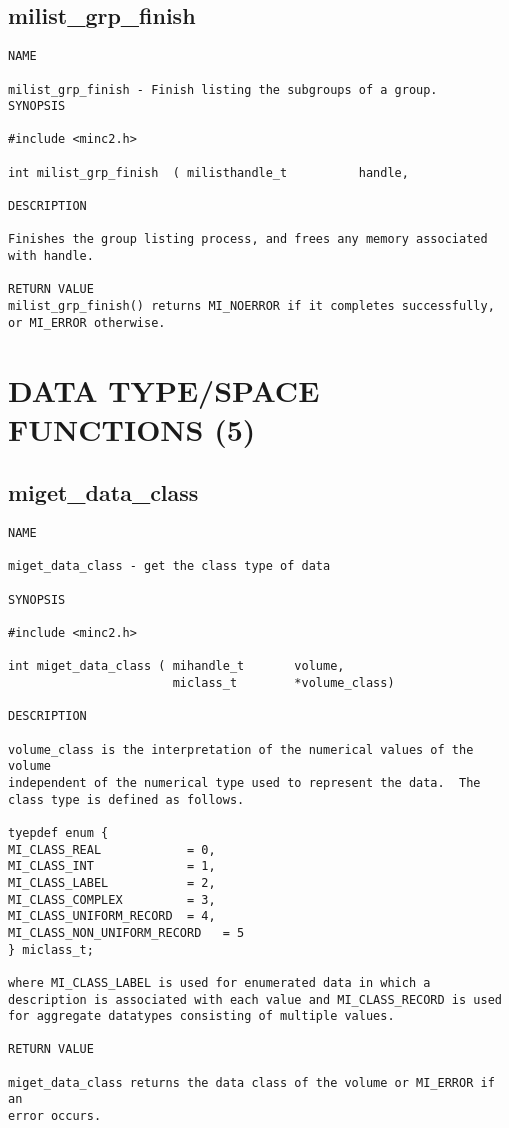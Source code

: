 \documentclass{article}
\begin{document}
\subsection{milist\_grp\_finish}

\begin{verbatim}
NAME

milist_grp_finish - Finish listing the subgroups of a group.
SYNOPSIS

#include <minc2.h>

int milist_grp_finish  ( milisthandle_t          handle, 
                       
DESCRIPTION

Finishes the group listing process, and frees any memory associated
with handle.

RETURN VALUE
milist_grp_finish() returns MI_NOERROR if it completes successfully,
or MI_ERROR otherwise.

\end{verbatim}

\section{DATA TYPE/SPACE FUNCTIONS (5)}
\subsection{miget\_data\_class}

\begin{verbatim}
NAME

miget_data_class - get the class type of data

SYNOPSIS

#include <minc2.h>

int miget_data_class ( mihandle_t       volume,
                       miclass_t        *volume_class) 

DESCRIPTION

volume_class is the interpretation of the numerical values of the volume
independent of the numerical type used to represent the data.  The
class type is defined as follows.

tyepdef enum {
MI_CLASS_REAL            = 0,
MI_CLASS_INT             = 1,
MI_CLASS_LABEL           = 2,
MI_CLASS_COMPLEX         = 3,
MI_CLASS_UNIFORM_RECORD  = 4,
MI_CLASS_NON_UNIFORM_RECORD   = 5
} miclass_t;

where MI_CLASS_LABEL is used for enumerated data in which a
description is associated with each value and MI_CLASS_RECORD is used
for aggregate datatypes consisting of multiple values.
 
RETURN VALUE

miget_data_class returns the data class of the volume or MI_ERROR if an 
error occurs.
\end{verbatim}
\end{document}
